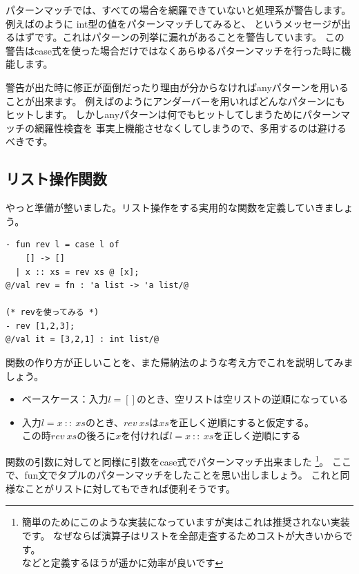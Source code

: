 \documentclass[11pt,a4paper]{jarticle}
\begin{document}
パターンマッチでは、すべての場合を網羅できていないと処理系が警告します。\\
例えばのように
int型の値をパターンマッチしてみると、
というメッセージが出るはずです。これはパターンの列挙に漏れがあることを警告しています。
この警告はcase式を使った場合だけではなくあらゆるパターンマッチを行った時に機能します。

警告が出た時に修正が面倒だったり理由が分からなければanyパターンを用いることが出来ます。
例えばのようにアンダーバーを用いればどんなパターンにもヒットします。
しかしanyパターンは何でもヒットしてしまうためにパターンマッチの網羅性検査を
事実上機能させなくしてしまうので、多用するのは避けるべきです。

\subsection{リスト操作関数}

やっと準備が整いました。リスト操作をする実用的な関数を定義していきましょう。

\begin{lstlisting}[caption=リストを逆順にする関数revを定義する,label=code:rev1]
- fun rev l = case l of
    [] -> []
  | x :: xs = rev xs @ [x];
@/val rev = fn : 'a list -> 'a list/@

(* revを使ってみる *)
- rev [1,2,3];
@/val it = [3,2,1] : int list/@
\end{lstlisting}

関数の作り方が正しいことを、また帰納法のような考え方でこれを説明してみましょう。
\begin{itemize}
\item ベースケース：入力$l=[]$のとき、空リストは空リストの逆順になっている
\item 入力$l = x \ :: \ xs$のとき、$rev \ xs$は$xs$を正しく逆順にすると仮定する。\\
  この時$rev \ xs$の後ろに$x$を付ければ$l = x \ :: \ xs$を正しく逆順にする
\end{itemize}

関数の引数に対してと同様に引数をcase式でパターンマッチ出来ました
\footnote{簡単のためにこのような実装になっていますが実はこれは推奨されない実装です。
なぜならば演算子はリストを全部走査するためコストが大きいからです。\\
などと定義するほうが遥かに効率が良いです}。
ここで、fun文でタプルのパターンマッチをしたことを思い出しましょう。
これと同様なことがリストに対してもできれば便利そうです。
\end{document}
